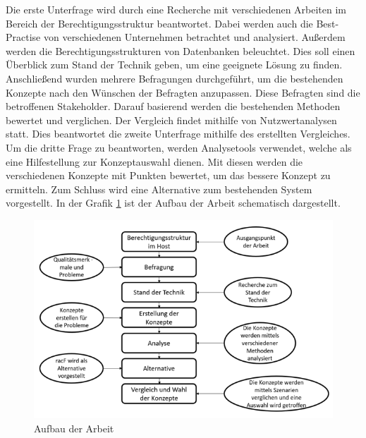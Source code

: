 Die erste Unterfrage wird durch eine Recherche mit verschiedenen Arbeiten im Bereich der Berechtigungsstruktur beantwortet.
Dabei werden auch die Best-Practise von verschiedenen Unternehmen betrachtet und analysiert.
Außerdem werden die Berechtigungsstrukturen von Datenbanken beleuchtet.
Dies soll einen Überblick zum Stand der Technik geben, um eine geeignete Lösung zu finden.
\newline
Anschließend wurden mehrere Befragungen durchgeführt, um die bestehenden Konzepte nach den Wünschen der Befragten anzupassen.
Diese Befragten sind die betroffenen Stakeholder.
Darauf basierend werden die bestehenden Methoden bewertet und verglichen.
Der Vergleich findet mithilfe von Nutzwertanalysen statt.
Dies beantwortet die zweite Unterfrage mithilfe des erstellten Vergleiches.
\newline
Um die dritte Frage zu beantworten, werden Analysetools verwendet, welche als eine Hilfestellung zur Konzeptauswahl dienen.
Mit diesen werden die verschiedenen Konzepte mit Punkten bewertet, um das bessere Konzept zu ermitteln.
Zum Schluss wird eine Alternative zum bestehenden System vorgestellt.
In der Grafik \ref{fig:vorgehen} ist der Aufbau der Arbeit schematisch dargestellt.
\newpage
\begin{figure}[h!]
\hspace*{-3cm}
 \centering
 \includegraphics[width=1.5\textwidth]{gfx/Picture/Vorgehen.PNG}
 \caption{Aufbau der Arbeit}
 \label{fig:vorgehen}
\end{figure}